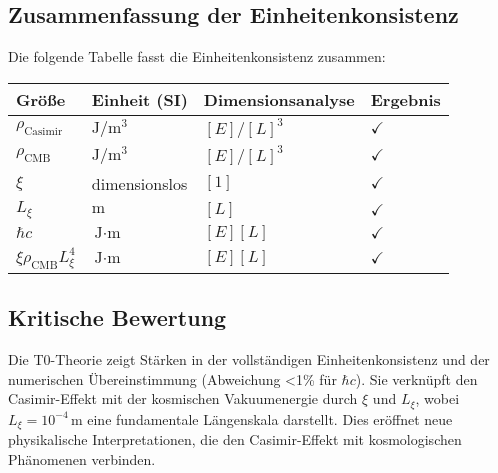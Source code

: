 \documentclass{article}
\begin{document}
	\subsection{Zusammenfassung der Einheitenkonsistenz}
	Die folgende Tabelle fasst die Einheitenkonsistenz zusammen:
	\begin{table}[h]
		\centering
		\begin{tabular}{l l l l}
			\toprule
			Größe & Einheit (SI) & Dimensionsanalyse & Ergebnis \\
			\midrule
			$\rho_{\text{Casimir}}$ & $\text{J}/\text{m}^3$ & $[E]/[L]^3$ & $\checkmark$ \\
			$\rho_{\text{CMB}}$ & $\text{J}/\text{m}^3$ & $[E]/[L]^3$ & $\checkmark$ \\
			$\xi$ & dimensionslos & $[1]$ & $\checkmark$ \\
			$L_\xi$ & $\text{m}$ & $[L]$ & $\checkmark$ \\
			$\hbar c$ & $\text{J} \cdot \text{m}$ & $[E][L]$ & $\checkmark$ \\
			$\xi \rho_{\text{CMB}} L_\xi^4$ & $\text{J} \cdot \text{m}$ & $[E][L]$ & $\checkmark$ \\
			\bottomrule
		\end{tabular}
	\end{table}
	
	\subsection{Kritische Bewertung}
	Die T0-Theorie zeigt Stärken in der vollständigen Einheitenkonsistenz und der numerischen Übereinstimmung (Abweichung <1\% für $\hbar c$). Sie verknüpft den Casimir-Effekt mit der kosmischen Vakuumenergie durch $\xi$ und $L_\xi$, wobei $L_\xi = 10^{-4} \, \text{m}$ eine fundamentale Längenskala darstellt. Dies eröffnet neue physikalische Interpretationen, die den Casimir-Effekt mit kosmologischen Phänomenen verbinden.
	
\end{document}
